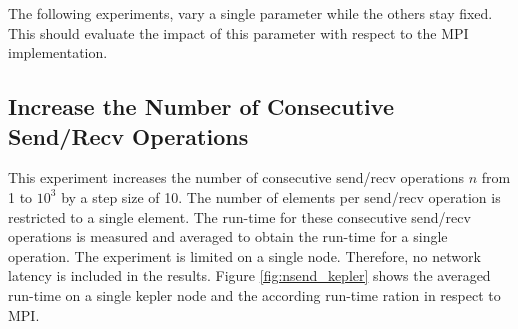 \noindent The following experiments, vary a single parameter while the
others stay fixed. This should evaluate the impact of this parameter
with respect to the MPI implementation.

\subsection*{Increase the Number of Consecutive Send/Recv Operations}
This experiment increases the number of consecutive send/recv
operations $n$ from 1 to $10^3$ by a step size of 10. The number of
elements per send/recv operation is restricted to a single
element. The run-time for these consecutive send/recv operations is
measured and averaged to obtain the run-time for a single operation.
The experiment is limited on a single node. Therefore, no network
latency is included in the results.  Figure \ref{fig:nsend_kepler}
shows the averaged run-time on a single kepler node and the according
run-time ration in respect to MPI.

